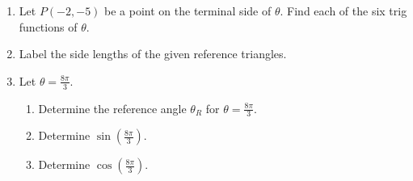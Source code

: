 



\begin{enumerate}
\item  Let $P(-2,-5)$ be a point on the terminal side of $\theta$.  Find each of the six trig functions of $\theta$.

\begin{enumerate}
\end{enumerate}

\vfill
\item Label the side lengths of the given reference triangles.
\begin{multicols}{2}
	 \quad \quad \quad \quad \quad \quad 
	\columnbreak

\end{multicols}
\clearpage


\item  Let $\displaystyle \theta=\frac{8\pi}{3}$.
\begin{enumerate}
\item Determine the reference angle $\theta_R$ for $\displaystyle \theta=\frac{8\pi}{3}$.\vfill
\item Determine $\sin\left(\frac{8\pi}{3}\right)$.\vfill
\item Determine $\cos\left(\frac{8\pi}{3}\right)$.\vfill
\end{enumerate}





\end{enumerate}



